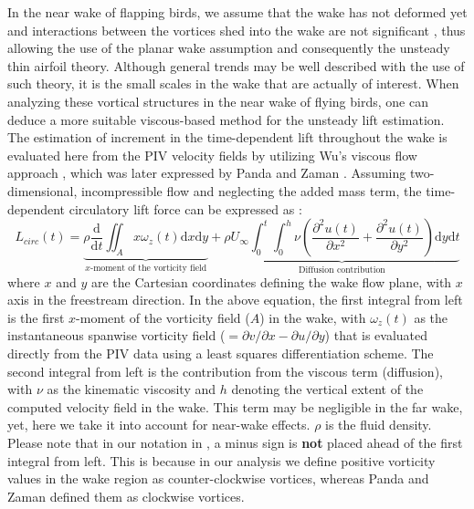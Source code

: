 \documentclass[12pt,a4paper]{article}
\begin{document}
In the near wake of flapping birds, we assume that the wake has not deformed yet and interactions between the vortices shed into the wake are not significant \cite{Stalnov2015}, thus allowing the use of the planar wake assumption and consequently the unsteady thin airfoil theory. 
Although general trends may be well described with the use of such theory, it is the small scales in the wake that are actually of interest. 
When analyzing these vortical structures in the near wake of flying birds, one can deduce a more suitable viscous-based method for the unsteady lift estimation. 
The estimation of increment in the time-dependent lift throughout the wake is evaluated here from the PIV velocity fields by utilizing Wu's viscous flow approach \cite{Wu1981}, which was later expressed by Panda and Zaman \cite{Panda1994}.
Assuming two-dimensional, incompressible flow and neglecting the added mass term, the time-dependent circulatory lift force can be expressed as \cite{Panda1994}:
\begin{equation}
L_{circ}(t) = \underbrace{\rho \frac{\mathrm{d}}{\mathrm{d}t}\iint_Ax\omega_z(t)\mathrm{d}x\mathrm{d}y}_{x\text{-moment of the vorticity field}} + \underbrace{\rho U_\infty \int_0^t \int_0^h\nu \left( \frac{\partial^2u(t)}{\partial x^2} + \frac{\partial^2u(t)}{\partial y^2} \right)\mathrm{d}y \mathrm{d}t}_{\text{Diffusion contribution}}
\label{eq:inst_Lift}
\end{equation}
where $x$ and $y$ are the Cartesian coordinates defining the wake flow plane, with $x$ axis in the freestream direction. In the above equation, the first integral from left is the first $x$-moment of the vorticity field ($A$) in the wake, with $\omega_z(t)$ as the instantaneous spanwise vorticity field ($=\partial v/\partial x - \partial u/\partial y$) that is evaluated directly from the PIV data using a least squares differentiation scheme. The second integral from left is the contribution from the viscous term (diffusion), with $\nu$ as the kinematic viscosity and $h$ denoting the vertical extent of the computed velocity field in the wake. This term may be negligible in the far wake, yet, here we take it into account for near-wake effects. $\rho$ is the fluid density.
Please note that in our notation in , a minus sign is \textbf{not} placed ahead of the first integral from left. This is because in our analysis we define positive vorticity values in the wake region as counter-clockwise vortices, whereas Panda and Zaman \cite{Panda1994} defined them as clockwise vortices.
\end{document}
